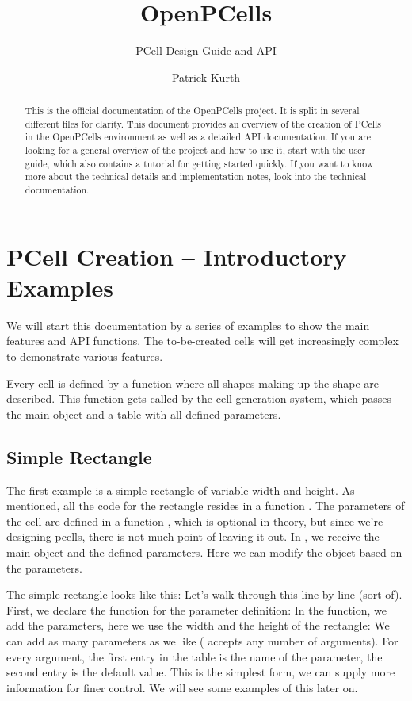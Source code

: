 

\title{OpenPCells}
\subtitle{PCell Design Guide and API}
\author{Patrick Kurth}


\maketitle
\begin{abstract}
    \noindent This is the official documentation of the OpenPCells project.  It is split in several different files for clarity. This document provides an overview
    of the creation of PCells in the OpenPCells environment as well as a detailed API documentation.  If you are looking for a general overview of the project and
    how to use it, start with the user guide, which also contains a tutorial for getting started quickly. If you want to know more about the technical details and
    implementation notes, look into the technical documentation.
\end{abstract}

\tableofcontents

\section{PCell Creation -- Introductory Examples}
We will start this documentation by a series of examples to show the main features and API functions. The to-be-created cells will get increasingly complex to
demonstrate various features.

Every cell is defined by a function where all shapes making up the shape are described. This function gets called by the cell generation system, which passes the
main object and a table with all defined parameters.

\subsection{Simple Rectangle}
The first example is a simple rectangle of variable width and height. As mentioned, all the code for the rectangle resides in a function .
The parameters of the cell are defined in a function , which is optional in theory, but since we're designing pcells, there is not much point
of leaving it out. In , we receive the main object and the defined parameters. Here we can modify the object based on the parameters.

The simple rectangle looks like this:
Let's walk through this line-by-line (sort of). First, we declare the function for the parameter definition:
In the function, we add the parameters, here we use the width and the height of the rectangle:
We can add as many parameters as we like ( accepts any number of arguments). For every argument, the first entry in the table is
the name of the parameter, the second entry is the default value. This is the simplest form, we can supply more information for finer control. We will see some
examples of this later on.

